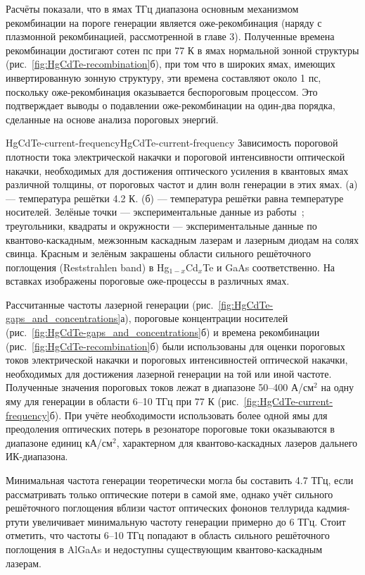 Расчёты показали, что в ямах ТГц диапазона основным механизмом рекомбинации на пороге генерации является оже-рекомбинация (наряду с плазмонной рекомбинацией, рассмотренной в главе 3). Полученные времена рекомбинации достигают сотен пс при 77 К в ямах нормальной зонной структуры (рис.~\ref{fig:HgCdTe-recombination}б), при том что в широких ямах, имеющих инвертированную зонную структуру, эти времена составляют около 1 пс, поскольку оже-рекомбинация оказывается беспороговым процессом. Это подтверждает выводы о подавлении оже-рекомбинации на один-два порядка, сделанные на основе анализа пороговых энергий.

\begin{fig}{HgCdTe-current-frequency}{HgCdTe-current-frequency} Зависимость пороговой плотности тока электрической накачки и пороговой интенсивности оптической накачки, необходимых для достижения оптического усиления в квантовых ямах \HgCdTe{} различной толщины, от пороговых частот и длин волн генерации в этих ямах. (а) --- температура решётки 4.2 К. (б) --- температура решётки равна температуре носителей. Зелёные точки --- экспериментальные данные из работы~\cite{HgCdTe-stimulated_emission}; треугольники, квадраты и окружности --- экспериментальные данные по квантово-каскадным, межзонным каскадным лазерам и лазерным диодам на солях свинца. Красным и зелёным закрашены области сильного решёточного поглощения (Reststrahlen band) в Hg$_{1-x}$Cd$_{x}$Te и GaAs соответственно. На вставках изображены пороговые оже-процессы в различных ямах.
\end{fig}

Рассчитанные частоты лазерной генерации (рис.~\ref{fig:HgCdTe-gaps_and_concentrations}а), пороговые концентрации носителей (рис.~\ref{fig:HgCdTe-gaps_and_concentrations}б) и времена рекомбинации (рис.~\ref{fig:HgCdTe-recombination}б) были использованы для оценки пороговых токов электрической накачки и пороговых интенсивностей оптической накачки, необходимых для достижения лазерной генерации на той или иной частоте. Полученные значения пороговых токов лежат в диапазоне 50--400 А/см$^2$ на одну яму для генерации в области 6--10 ТГц при 77 К (рис.~\ref{fig:HgCdTe-current-frequency}б). При учёте необходимости использовать более одной ямы для преодоления оптических потерь в резонаторе пороговые токи оказываются в диапазоне единиц кА/см$^2$, характерном для квантово-каскадных лазеров дальнего ИК-диапазона. 

Минимальная частота генерации теоретически могла бы составить 4.7 ТГц, если рассматривать только оптические потери в самой яме, однако учёт сильного решёточного поглощения вблизи частот оптических фононов теллурида кадмия-ртути увеличивает минимальную частоту генерации примерно до 6 ТГц. Стоит отметить, что частоты 6--10 ТГц попадают в область сильного решёточного поглощения в AlGaAs и недоступны существующим квантово-каскадным лазерам.


